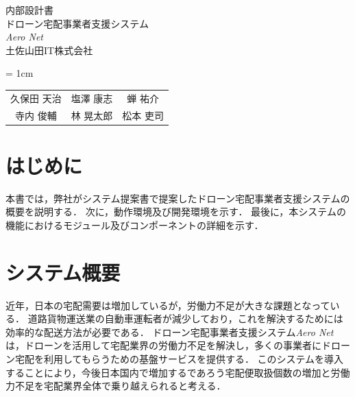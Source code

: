 \documentclass[a4paper, titlepage]{jsarticle}
\date{\today}
\newcommand{\system}{\textsl{Aero Net}}
\begin{document}
\begin{titlepage}
  \centering
  \vspace*{150truept}
  {\Large 内部設計書}\\
  \vspace*{50truept}
  {\Huge ドローン宅配事業者支援システム} \\
  \vspace{15truept}
  {\Huge \system} \\
  \vspace{50truept}
  {\LARGE 土佐山田IT株式会社}\\
  \vspace{20truept}
  {\large{\tabcolsep = 1cm
      \begin{tabular}{ccc}
        久保田 天治 & 塩澤 康志 & 蝉 祐介  \\
        寺内 俊輔  & 林 晃太郎 & 松本 吏司
      \end{tabular}
    }}
\end{titlepage}
\newcommand{\definition}[2]{
  \begin{figure}[H]
    \centering
    \texttt{[image: module/definition/\#1.pdf]}
    \caption{#2}
    \label{fig:#1}
  \end{figure}
  \clearpage
}

\tableofcontents

\clearpage

\section{はじめに}
本書では，弊社がシステム提案書で提案したドローン宅配事業者支援システムの概要を説明する．
次に，動作環境及び開発環境を示す．
最後に，本システムの機能におけるモジュール及びコンポーネントの詳細を示す．

\section{システム概要}
近年，日本の宅配需要は増加しているが，労働力不足が大きな課題となっている．
道路貨物運送業の自動車運転者が減少しており，これを解決するためには効率的な配送方法が必要である．
ドローン宅配事業者支援システム\system は，ドローンを活用して宅配業界の労働力不足を解決し，多くの事業者にドローン宅配を利用してもらうための基盤サービスを提供する．
このシステムを導入することにより，今後日本国内で増加するであろう宅配便取扱個数の増加と労働力不足を宅配業界全体で乗り越えられると考える．
\end{document}
